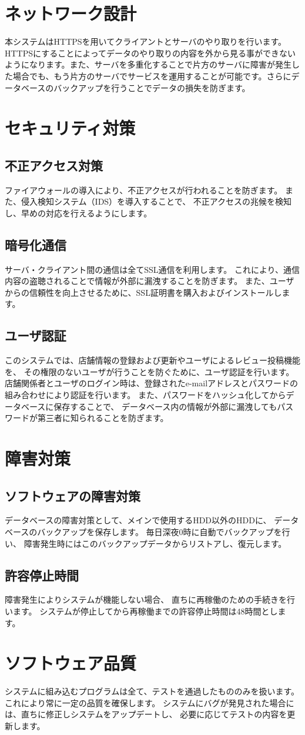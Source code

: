 \documentclass[a4j,titlepage]{jarticle}
\begin{document}
\section{ネットワーク設計}
本システムはHTTPSを用いてクライアントとサーバのやり取りを行います。HTTPSにすることによってデータのやり取りの内容を外から見る事ができないようになります。また、サーバを多重化することで片方のサーバに障害が発生した場合でも、もう片方のサーバでサービスを運用することが可能です。さらにデータベースのバックアップを行うことでデータの損失を防ぎます。

\section{セキュリティ対策}
\subsection{不正アクセス対策}
ファイアウォールの導入により、不正アクセスが行われることを防ぎます。
また、侵入検知システム（IDS）を導入することで、
不正アクセスの兆候を検知し、早めの対応を行えるようにします。
\subsection{暗号化通信}
サーバ・クライアント間の通信は全てSSL通信を利用します。
これにより、通信内容の盗聴されることで情報が外部に漏洩することを防ぎます。
また、ユーザからの信頼性を向上させるために、SSL証明書を購入およびインストールします。
\subsection{ユーザ認証}
このシステムでは、店舗情報の登録および更新やユーザによるレビュー投稿機能を、
その権限のないユーザが行うことを防ぐために、ユーザ認証を行います。
店舗関係者とユーザのログイン時は、登録されたe-mailアドレスとパスワードの組み合わせにより認証を行います。
また、パスワードをハッシュ化してからデータベースに保存することで、
データベース内の情報が外部に漏洩してもパスワードが第三者に知られることを防ぎます。

\section{障害対策}
\subsection{ソフトウェアの障害対策}
データベースの障害対策として、メインで使用するHDD以外のHDDに、
データベースのバックアップを保存します。
毎日深夜0時に自動でバックアップを行い、
障害発生時にはこのバックアップデータからリストアし、復元します。
\subsection{許容停止時間}
障害発生によりシステムが機能しない場合、
直ちに再稼働のための手続きを行います。
システムが停止してから再稼働までの許容停止時間は48時間とします。

\section{ソフトウェア品質}
システムに組み込むプログラムは全て、テストを通過したもののみを扱います。
これにより常に一定の品質を確保します。
システムにバグが発見された場合には、直ちに修正しシステムをアップデートし、
必要に応じてテストの内容を更新します。
\end{document}
